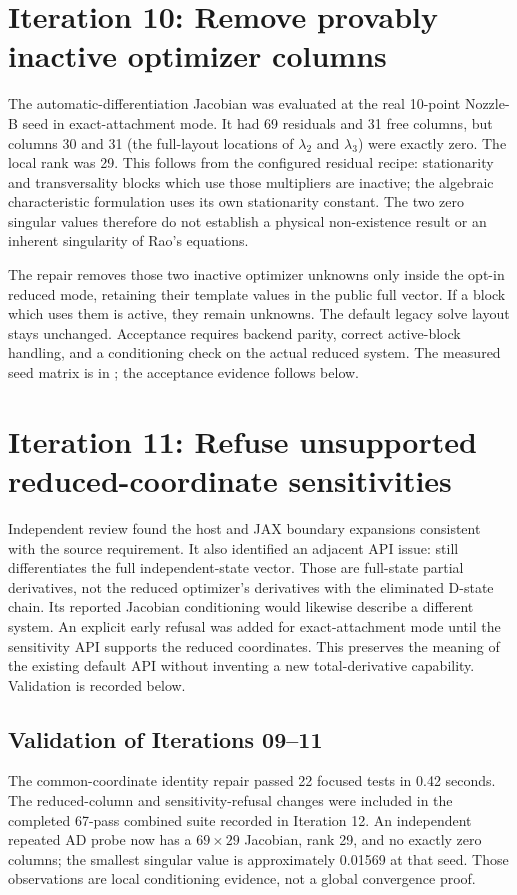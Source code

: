 \section{Iteration 10: Remove provably inactive optimizer columns}
The automatic-differentiation Jacobian was evaluated at the real
10-point Nozzle-B seed in exact-attachment mode. It had 69 residuals and
31 free columns, but columns 30 and 31 (the full-layout locations of
$\lambda_2$ and $\lambda_3$) were exactly zero. The local rank was 29.
This follows from the configured residual recipe: stationarity and
transversality blocks which use those multipliers are inactive; the
algebraic characteristic formulation uses its own stationarity constant.
The two zero singular values therefore do not establish a physical
non-existence result or an inherent singularity of Rao's equations.

The repair removes those two inactive optimizer unknowns only
inside the opt-in reduced mode, retaining their template values in the
public full vector. If a block which uses them is active, they remain
unknowns. The default legacy solve layout stays unchanged. Acceptance
requires backend parity, correct active-block handling, and a conditioning
check on the actual reduced system. The measured seed matrix is in
; the acceptance evidence follows below.

\section{Iteration 11: Refuse unsupported reduced-coordinate sensitivities}
Independent review found the host and JAX boundary expansions consistent
with the source requirement. It also identified an
adjacent API issue:  still differentiates the
full independent-state vector. Those are full-state partial derivatives,
not the reduced optimizer's derivatives with the eliminated D-state chain.
Its reported Jacobian conditioning would likewise describe a different
system. An explicit early refusal was added for exact-attachment
mode until the sensitivity API supports the reduced coordinates. This
preserves the meaning of the existing default API without inventing a
new total-derivative capability. Validation is recorded below.

\subsection{Validation of Iterations 09--11}
The common-coordinate identity repair passed 22 focused tests in 0.42
seconds. The reduced-column and sensitivity-refusal changes were included
in the completed 67-pass combined suite recorded in Iteration 12. An
independent repeated AD probe now has a $69\times29$ Jacobian, rank 29,
and no exactly zero columns; the smallest singular value is approximately
0.01569 at that seed. Those observations are local conditioning evidence,
not a global convergence proof.


